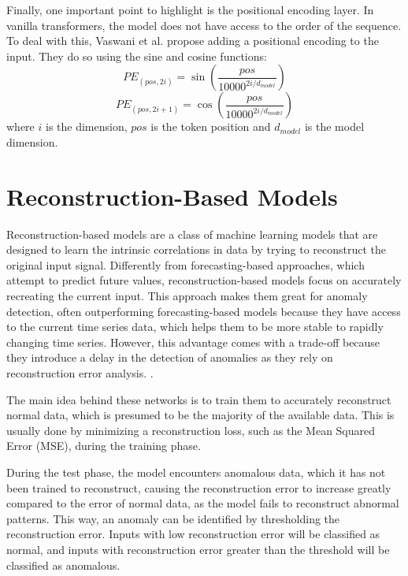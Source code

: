 Finally, one important point to highlight is the positional encoding layer. In vanilla transformers, the model does not have access to the order of the sequence. To deal with this, Vaswani et al. \cite{vaswani2023attentionneed} propose adding a positional encoding to the input. They do so using the sine and cosine functions:
\begin{equation}
    PE_{(pos,2i)} = \sin\left(\frac{pos}{10000^{2i/d_{model}}}\right)
\end{equation}
\begin{equation}
    PE_{(pos,2i+1)} = \cos\left(\frac{pos}{10000^{2i/d_{model}}}\right)
\end{equation}
where $i$ is the dimension, $pos$ is the token position and $d_{model}$ is the model dimension.


\section{Reconstruction-Based Models}

Reconstruction-based models are a class of machine learning models that are designed to learn the intrinsic correlations in data by trying to reconstruct the original input signal. Differently from forecasting-based approaches, which attempt to predict future values, reconstruction-based models focus on accurately recreating the current input. This approach makes them great for anomaly detection, often outperforming forecasting-based models because they have access to the current time series data, which helps them to be more stable to rapidly changing time series. However, this advantage comes with a trade-off because they introduce a delay in the detection of anomalies as they rely on reconstruction error analysis. \cite{Zamanzadeh_Darban_Webb_Pan_Aggarwal_Salehi_2024}. 

The main idea behind these networks is to train them to accurately reconstruct normal data, which is presumed to be the majority of the available data. This is usually done by minimizing a reconstruction loss, such as the Mean Squared Error (MSE), during the training phase. 

During the test phase, the model encounters anomalous data, which it has not been trained to reconstruct, causing the reconstruction error to increase greatly compared to the error of normal data, as the model fails to reconstruct abnormal patterns. This way, an anomaly can be identified by thresholding the reconstruction error. Inputs with low reconstruction error will be classified as normal, and inputs with reconstruction error greater than the threshold will be classified as anomalous.

